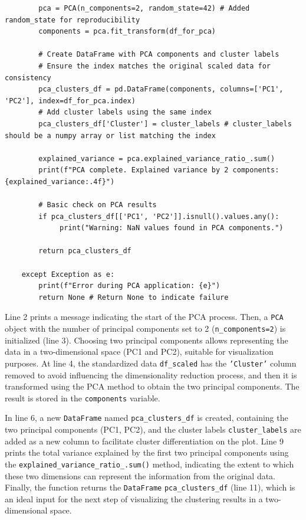 \documentclass[12pt]{report}
\begin{document}
{{{\begin{lstlisting}
        pca = PCA(n_components=2, random_state=42) # Added random_state for reproducibility
        components = pca.fit_transform(df_for_pca)

        # Create DataFrame with PCA components and cluster labels
        # Ensure the index matches the original scaled data for consistency
        pca_clusters_df = pd.DataFrame(components, columns=['PC1', 'PC2'], index=df_for_pca.index)
        # Add cluster labels using the same index
        pca_clusters_df['Cluster'] = cluster_labels # cluster_labels should be a numpy array or list matching the index

        explained_variance = pca.explained_variance_ratio_.sum()
        print(f"PCA complete. Explained variance by 2 components: {explained_variance:.4f}")

        # Basic check on PCA results
        if pca_clusters_df[['PC1', 'PC2']].isnull().values.any():
             print("Warning: NaN values found in PCA components.")

        return pca_clusters_df

    except Exception as e:
        print(f"Error during PCA application: {e}")
        return None # Return None to indicate failure

\end{lstlisting}
Line 2 prints a message indicating the start of the PCA process. Then, a \texttt{PCA} object with the number of principal components set to 2 (\texttt{n\_components=2}) is initialized (line 3). Choosing two principal components allows representing the data in a two-dimensional space (PC1 and PC2), suitable for visualization purposes. At line 4, the standardized data \texttt{df\_scaled} has the \texttt{'Cluster'} column removed to avoid influencing the dimensionality reduction process, and then it is transformed using the PCA method to obtain the two principal components. The result is stored in the \texttt{components} variable.

In line 6, a new \texttt{DataFrame} named \texttt{pca\_clusters\_df} is created, containing the two principal components (PC1, PC2), and the cluster labels \texttt{cluster\_labels} are added as a new column to facilitate cluster differentiation on the plot. Line 9 prints the total variance explained by the first two principal components using the \texttt{explained\_variance\_ratio\_.sum()} method, indicating the extent to which these two dimensions can represent the information from the original data. Finally, the function returns the \texttt{DataFrame} \texttt{pca\_clusters\_df} (line 11), which is an ideal input for the next step of visualizing the clustering results in a two-dimensional space.
}}}
\end{document}
